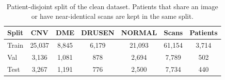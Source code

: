 \begin{table}[t]
\centering
\small
\caption{Patient-disjoint split of the clean dataset. Patients that share an image or have near-identical scans are kept in the same split.}
\label{tab:split}
\begin{tabular}{lcccccc}
\toprule
Split & CNV & DME & DRUSEN & NORMAL & Scans & Patients \\
\midrule
Train & 25,037 & 8,845 & 6,179 & 21,093 & 61,154 & 3,714 \\
Val & 3,136 & 1,081 & 878 & 2,694 & 7,789 & 502 \\
Test & 3,267 & 1,191 & 776 & 2,500 & 7,734 & 440 \\
\bottomrule
\end{tabular}
\end{table}